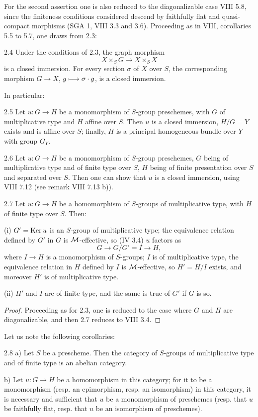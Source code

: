 For the second assertion one is also reduced to the diagonalizable case VIII 5.8, since the finiteness conditions considered descend by faithfully flat and quasi-compact morphisms (SGA 1, VIII 3.3 and 3.6). Proceeding as in VIII, corollaries 5.5 to 5.7, one draws from 2.3:
\begin{corollary}{2.4}\label{IX.2.4}
Under the conditions of 2.3, the graph morphism
\[
X\times_S G\to X\times_S X
\]
is a closed immersion. For every section $\sigma$ of $X$ over $S$, the corresponding morphism $G\to X$, $g\mto\sigma\cdot g$, is a closed immersion.
\end{corollary}
In particular:
\begin{corollary}{2.5}\label{IX.2.5}
Let $u:G\to H$ be a monomorphism of $S$-group preschemes, with $G$ of multiplicative type and $H$ affine over $S$. Then $u$ is a closed immersion, $H/G=Y$ exists and is affine over $S$; finally, $H$ is a principal homogeneous bundle over $Y$ with group $G_Y$.
\end{corollary}
\begin{remark}{2.6}\label{IX.2.6}
Let $u:G\to H$ be a monomorphism of $S$-group preschemes, $G$ being of multiplicative type and of finite type over $S$, $H$ being of finite presentation over $S$ and separated over $S$. Then one can show that $u$ is a closed immersion, using VIII 7.12 (see remark VIII 7.13 b)).
\end{remark}
\begin{proposition}{2.7}\label{IX.2.7}
Let $u:G\to H$ be a homomorphism of $S$-groups of multiplicative type, with $H$ of finite type over $S$. Then:

(i) $G'=\Ker u$ is an $S$-group of multiplicative type; the equivalence relation defined by $G'$ in $G$ is $\cal M$-effective, so (IV 3.4) $u$ factors as
\[
G\to G/G'=I\to H,
\]
where $I\to H$ is a monomorphism of $S$-groups; $I$ is of multiplicative type, the equivalence relation in $H$ defined by $I$ is $\cal M$-effective, so $H'=H/I$ exists, and moreover $H'$ is of multiplicative type.

(ii) $H'$ and $I$ are of finite type, and the same is true of $G'$ if $G$ is so.
\end{proposition}
\begin{proof}
Proceeding as for 2.3, one is reduced to the case where $G$ and $H$ are diagonalizable, and then 2.7 reduces to VIII 3.4.
\end{proof}
Let us note the following corollaries:
\begin{corollary}{2.8}\label{IX.2.8}
a) Let $S$ be a prescheme. Then the category of $S$-groups of multiplicative type and of finite type is an abelian category.

b) Let $u:G\to H$ be a homomorphism in this category; for it to be a monomorphism (resp. an epimorphism, resp. an isomorphism) in this category, it is necessary and sufficient that $u$ be a monomorphism of preschemes (resp. that $u$ be faithfully flat, resp. that $u$ be an isomorphism of preschemes).
\end{corollary}
